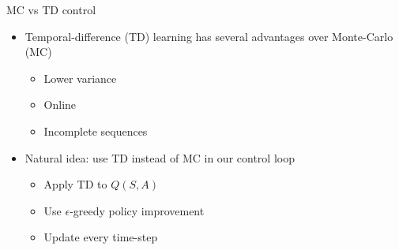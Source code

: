 \bgroup
\begin{frame}{MC vs TD control}
\begin{itemize}
\item Temporal-difference (TD) learning has several advantages over Monte-Carlo (MC)
\begin{itemize}
\item Lower variance
\item Online
\item Incomplete sequences
\end{itemize}
\item Natural idea: use TD instead of MC in our control loop
\begin{itemize}
\item Apply TD to $Q(S, A)$
\item Use $\epsilon$-greedy policy improvement
\item Update every time-step
\end{itemize}
\end{itemize}
\end{frame}
\egroup